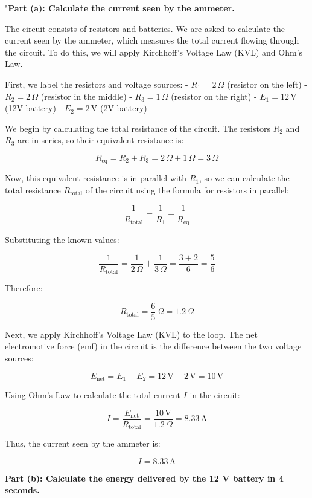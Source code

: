 "\textbf{Part (a): Calculate the current seen by the ammeter.}

The circuit consists of resistors and batteries. We are asked to calculate the current seen by the ammeter, which measures the total current flowing through the circuit. To do this, we will apply Kirchhoff’s Voltage Law (KVL) and Ohm’s Law.

First, we label the resistors and voltage sources:
- \( R_1 = 2 \, \Omega \) (resistor on the left)
- \( R_2 = 2 \, \Omega \) (resistor in the middle)
- \( R_3 = 1 \, \Omega \) (resistor on the right)
- \( E_1 = 12 \, \text{V} \) (12V battery)
- \( E_2 = 2 \, \text{V} \) (2V battery)

We begin by calculating the total resistance of the circuit. The resistors \( R_2 \) and \( R_3 \) are in series, so their equivalent resistance is:

\[
R_{\text{eq}} = R_2 + R_3 = 2 \, \Omega + 1 \, \Omega = 3 \, \Omega
\]

Now, this equivalent resistance is in parallel with \( R_1 \), so we can calculate the total resistance \( R_{\text{total}} \) of the circuit using the formula for resistors in parallel:

\[
\frac{1}{R_{\text{total}}} = \frac{1}{R_1} + \frac{1}{R_{\text{eq}}}
\]

Substituting the known values:

\[
\frac{1}{R_{\text{total}}} = \frac{1}{2 \, \Omega} + \frac{1}{3 \, \Omega} = \frac{3 + 2}{6} = \frac{5}{6}
\]

Therefore:

\[
R_{\text{total}} = \frac{6}{5} \, \Omega = 1.2 \, \Omega
\]

Next, we apply Kirchhoff’s Voltage Law (KVL) to the loop. The net electromotive force (emf) in the circuit is the difference between the two voltage sources:

\[
E_{\text{net}} = E_1 - E_2 = 12 \, \text{V} - 2 \, \text{V} = 10 \, \text{V}
\]

Using Ohm’s Law to calculate the total current \( I \) in the circuit:

\[
I = \frac{E_{\text{net}}}{R_{\text{total}}} = \frac{10 \, \text{V}}{1.2 \, \Omega} = 8.33 \, \text{A}
\]

Thus, the current seen by the ammeter is:

\[
I = 8.33 \, \text{A}
\]

\textbf{Part (b): Calculate the energy delivered by the 12 V battery in 4 seconds.}

